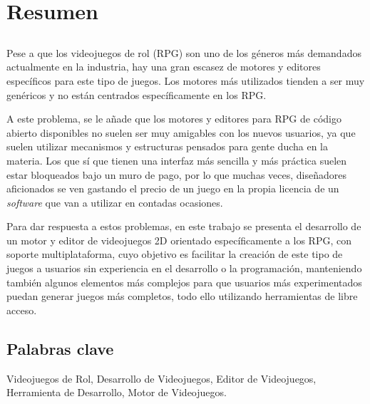 \chapter*{Resumen}

\section*{\tituloPortadaVal}

Pese a que los videojuegos de rol (RPG) son uno de los géneros más demandados actualmente en la industria, hay una gran escasez de motores y editores específicos para este tipo de juegos. Los motores más utilizados tienden a ser muy genéricos y no están centrados específicamente en los RPG.

\smallskip

A este problema, se le añade que los motores y editores para RPG de código abierto disponibles no suelen ser muy amigables con los nuevos usuarios, ya que suelen utilizar mecanismos y estructuras pensados para gente ducha en la materia. Los que sí que tienen una interfaz más sencilla y más práctica suelen estar bloqueados bajo un muro de pago, por lo que muchas veces, diseñadores aficionados se ven gastando el precio de un juego en la propia licencia de un \textit{software} que van a utilizar en contadas ocasiones.

\medskip

Para dar respuesta a estos problemas, en este trabajo se presenta el desarrollo de un motor y editor de videojuegos 2D orientado específicamente a los RPG, con soporte multiplataforma, cuyo objetivo es facilitar la creación de este tipo de juegos a usuarios sin experiencia en el desarrollo o la programación, manteniendo también algunos elementos más complejos para que usuarios más experimentados puedan generar juegos más completos, todo ello utilizando herramientas de libre acceso.

\section*{Palabras clave}
   
\noindent Videojuegos de Rol, Desarrollo de Videojuegos, Editor de Videojuegos, Herramienta de Desarrollo, Motor de Videojuegos.

   



